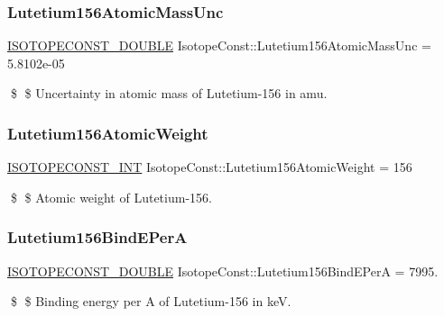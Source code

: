 \subsubsection{\texorpdfstring{Lutetium156\+Atomic\+Mass\+Unc}{Lutetium156AtomicMassUnc}}
{\footnotesize\ttfamily \mbox{\hyperlink{group___isotope_const-_macros_ga8f45a7272ce02c0b4c65c44636ed719a}{I\+S\+O\+T\+O\+P\+E\+C\+O\+N\+S\+T\+\_\+\+D\+O\+U\+B\+LE}} Isotope\+Const\+::\+Lutetium156\+Atomic\+Mass\+Unc = 5.\+8102e-\/05}

\$ \$ Uncertainty in atomic mass of Lutetium-\/156 in amu. \mbox{\label{group___isotope_const-_lutetium-_lu156_gaa924afe0e80d18a6f1cce9a992451cdf}} 
\subsubsection{\texorpdfstring{Lutetium156\+Atomic\+Weight}{Lutetium156AtomicWeight}}
{\footnotesize\ttfamily \mbox{\hyperlink{group___isotope_const-_macros_ga5f18360b3e99483a35c32d789e62621c}{I\+S\+O\+T\+O\+P\+E\+C\+O\+N\+S\+T\+\_\+\+I\+NT}} Isotope\+Const\+::\+Lutetium156\+Atomic\+Weight = 156}

\$ \$ Atomic weight of Lutetium-\/156. \mbox{\label{group___isotope_const-_lutetium-_lu156_gaeb6f55f8be43504d1ec128d8a234ce29}} 
\subsubsection{\texorpdfstring{Lutetium156\+Bind\+E\+PerA}{Lutetium156BindEPerA}}
{\footnotesize\ttfamily \mbox{\hyperlink{group___isotope_const-_macros_ga8f45a7272ce02c0b4c65c44636ed719a}{I\+S\+O\+T\+O\+P\+E\+C\+O\+N\+S\+T\+\_\+\+D\+O\+U\+B\+LE}} Isotope\+Const\+::\+Lutetium156\+Bind\+E\+PerA = 7995.}

\$ \$ Binding energy per A of Lutetium-\/156 in keV. \mbox{\label{group___isotope_const-_lutetium-_lu156_ga1b31398108af89adf5ecbe8f195ed1ec}} 
